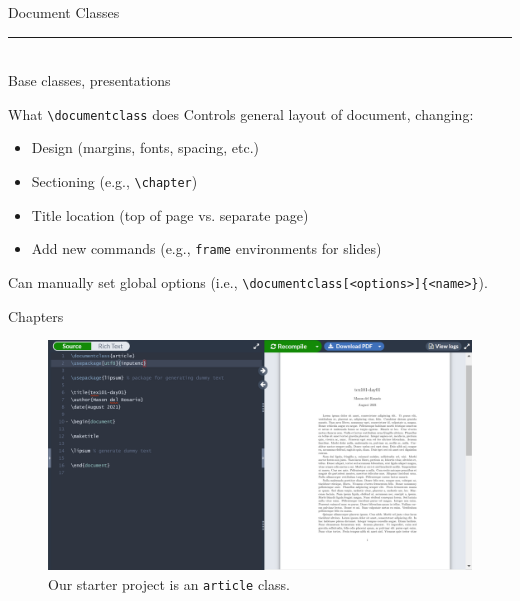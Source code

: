 \documentclass{beamer}
\begin{document}
{  \begin{frame}[plain]
    \vfill
    \centering
    \begin{beamercolorbox}[sep=8pt,center,shadow=true,rounded=true]{Document Classes}
      \insertsectionhead\par%
      \color{davisblue}\noindent\rule{10cm}{1pt} \\
      \footnotesize{Base classes, presentations}
    \end{beamercolorbox}
    \vfill
  \end{frame}

  \begin{frame}{What \texttt{\textbackslash documentclass} does}
    Controls general layout of document, changing:
    \begin{itemize}
      \item Design (margins, fonts, spacing, etc.)
      \item Sectioning (e.g., \texttt{\textbackslash chapter})
      \item Title location (top of page vs. separate page)
      \item Add new commands (e.g., \texttt{frame} environments for slides)
    \end{itemize}
    \pause
    Can manually set global options (i.e., \texttt{\textbackslash documentclass[<options>]\{<name>\}}).
  \end{frame}
  
  \begin{frame}{Chapters}
    \begin{figure}
      \includegraphics[width=0.9\linewidth]{day01-overleaf-07A-article.png}
      \caption{Our starter project is an \texttt{article} class.}
      \label{fig:day01-overleaf-07A}
    \end{figure}
  \end{frame}

}
\end{document}
